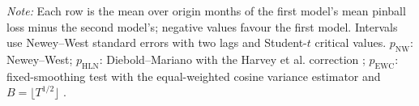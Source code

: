 \begin{table}[t]
\begin{tabular*}{\textwidth}{@{\extracolsep\fill}lrcrcccc@{}}
\bottomrule
\end{tabular*}
\begin{tablenotes}
\item \textit{Note:} Each row is the mean over origin months of the first model's mean pinball loss minus the second model's; negative values favour the first model. Intervals use Newey--West standard errors with two lags and Student-$t$ critical values. $p_{\mathrm{NW}}$: Newey--West; $p_{\mathrm{HLN}}$: Diebold--Mariano with the Harvey et al. correction \citep{harvey1997}; $p_{\mathrm{EWC}}$: fixed-smoothing test with the equal-weighted cosine variance estimator and $B=\lfloor T^{1/2}\rfloor$ \citep{lazarus2018,coroneo2020}.
\end{tablenotes}
\end{table}

